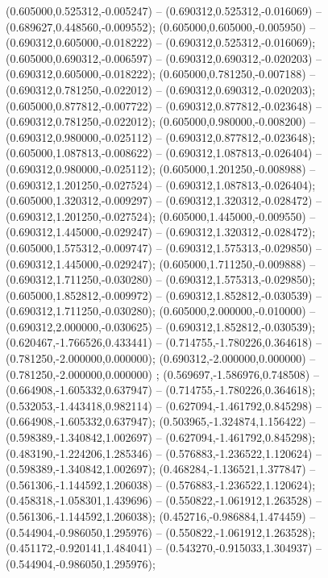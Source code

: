  (0.605000,0.525312,-0.005247) -- (0.690312,0.525312,-0.016069) -- (0.689627,0.448560,-0.009552);
 (0.605000,0.605000,-0.005950) -- (0.690312,0.605000,-0.018222) -- (0.690312,0.525312,-0.016069);
 (0.605000,0.690312,-0.006597) -- (0.690312,0.690312,-0.020203) -- (0.690312,0.605000,-0.018222);
 (0.605000,0.781250,-0.007188) -- (0.690312,0.781250,-0.022012) -- (0.690312,0.690312,-0.020203);
 (0.605000,0.877812,-0.007722) -- (0.690312,0.877812,-0.023648) -- (0.690312,0.781250,-0.022012);
 (0.605000,0.980000,-0.008200) -- (0.690312,0.980000,-0.025112) -- (0.690312,0.877812,-0.023648);
 (0.605000,1.087813,-0.008622) -- (0.690312,1.087813,-0.026404) -- (0.690312,0.980000,-0.025112);
 (0.605000,1.201250,-0.008988) -- (0.690312,1.201250,-0.027524) -- (0.690312,1.087813,-0.026404);
 (0.605000,1.320312,-0.009297) -- (0.690312,1.320312,-0.028472) -- (0.690312,1.201250,-0.027524);
 (0.605000,1.445000,-0.009550) -- (0.690312,1.445000,-0.029247) -- (0.690312,1.320312,-0.028472);
 (0.605000,1.575312,-0.009747) -- (0.690312,1.575313,-0.029850) -- (0.690312,1.445000,-0.029247);
 (0.605000,1.711250,-0.009888) -- (0.690312,1.711250,-0.030280) -- (0.690312,1.575313,-0.029850);
 (0.605000,1.852812,-0.009972) -- (0.690312,1.852812,-0.030539) -- (0.690312,1.711250,-0.030280);
 (0.605000,2.000000,-0.010000) -- (0.690312,2.000000,-0.030625) -- (0.690312,1.852812,-0.030539);
 (0.620467,-1.766526,0.433441) -- (0.714755,-1.780226,0.364618) -- (0.781250,-2.000000,0.000000);
 (0.690312,-2.000000,0.000000) -- (0.781250,-2.000000,0.000000) ;
 (0.569697,-1.586976,0.748508) -- (0.664908,-1.605332,0.637947) -- (0.714755,-1.780226,0.364618);
 (0.532053,-1.443418,0.982114) -- (0.627094,-1.461792,0.845298) -- (0.664908,-1.605332,0.637947);
 (0.503965,-1.324874,1.156422) -- (0.598389,-1.340842,1.002697) -- (0.627094,-1.461792,0.845298);
 (0.483190,-1.224206,1.285346) -- (0.576883,-1.236522,1.120624) -- (0.598389,-1.340842,1.002697);
 (0.468284,-1.136521,1.377847) -- (0.561306,-1.144592,1.206038) -- (0.576883,-1.236522,1.120624);
 (0.458318,-1.058301,1.439696) -- (0.550822,-1.061912,1.263528) -- (0.561306,-1.144592,1.206038);
 (0.452716,-0.986884,1.474459) -- (0.544904,-0.986050,1.295976) -- (0.550822,-1.061912,1.263528);
 (0.451172,-0.920141,1.484041) -- (0.543270,-0.915033,1.304937) -- (0.544904,-0.986050,1.295976);
